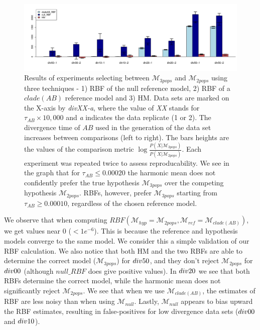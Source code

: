 \documentclass[11pt]{article}
\newcommand{\M}{\mathcal{M}}
\newcommand{\Mref}{\M_{ref}}
\newcommand{\Mhyp}{\M_{hyp}}
\newcommand{\1}{\mathbbm{1}}
\begin{document}
\begin{figure}[h]
 

\includegraphics[scale=0.4]{results/results-divAB-select}
\captionsetup{width=0.8\textwidth}
\caption{
Results of experiments selecting between $\M_{3pops}$ and $\M_{2pops}$ using three techniques - 1) RBF of the null reference model, 2) RBF of a $clade(AB)$ reference model and 3) HM.
%
Data sets are marked on the X-axis by \textit{divXX-a}, where the value of \textit{XX} stands for $\tau_{AB} \times 10,000$ and \textit{a} indicates the data replicate (1 or 2).
%
The divergence time of $AB$ used in the generation of the data set increases between comparisons (left to right).
%
The bars heights are the values of the comparison metric $\log{\frac{P(X|\M_{3pops})}{P(X|\M_{2pops})}}$.
%
Each experiment was repeated twice to assess reproducability. We see in the graph that for $\tau_{AB} \leq 0.00020$ the harmonic mean does not confidently prefer the true hypothesis $\M_{3pops}$ over the competing hypothesis $\M_{2pops}$.
%
RBFs, however, prefer $\M_{3pops}$ starting from $\tau_{AB} \geq 0.00010$, regardless of the chosen reference model.
%
}
\label{fig:results-divAB}
\end{figure}


We observe that when computing $RBF(\Mhyp=\M_{2pops}, \Mref=\M_{clade(AB)})$, we get values near 0 ($<1e^{-6}$). This is because the reference and hypothesis models converge to the same model. We consider this a simple validation of our RBF calculation. 
%
We also notice that both HM and the two RBFs are able to determine the correct model ($\M_{3pops}$) for $div\-50$, and they don't reject $\M_{2pops}$ for $div\-00$ (although $null\_RBF$ does give positive values). 
%
In $div\-20$ we see that both RBFs determine the correct model, while the harmonic mean does not significantly reject $\M_{2pops}$.
%
We see that when we use $\M_{clade(AB)}$, the estimates of RBF are less noisy than when using $\M_{null}$.
%
Lastly, $\M_{null}$ appears to bias upward the RBF estimates, resulting in false-positives for low divergence data sets ($div\-00$ and $div\-10$).
\end{document}
